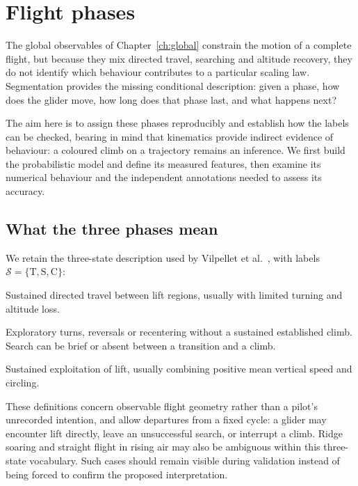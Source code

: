 \chapter{Flight phases}
\label{ch:phases}


The global observables of Chapter~\ref{ch:global} constrain the motion of a complete
flight, but because they mix directed travel, searching and altitude recovery, they do
not identify which behaviour contributes to a particular scaling law. Segmentation
provides the missing conditional description: given a phase, how does the glider move,
how long does that phase last, and what happens next?

The aim here is to assign these phases reproducibly and establish how the labels can
be checked, bearing in mind that kinematics provide indirect evidence of behaviour:
a coloured climb on a trajectory remains an inference. We first build the probabilistic model and define its measured features, then examine its numerical behaviour and the independent
annotations needed to assess its accuracy.

\section{What the three phases mean}
\label{sec:segmentation}
We retain the three-state description used by Vilpellet et al.~\cite{vilpellet2026},
with labels $\mathcal S=\{\mathrm T,\mathrm S,\mathrm C\}$:
\begin{description}[style=nextline]
  \item[Transition (T).] Sustained directed travel between lift regions, usually with
  limited turning and altitude loss.
  \item[Search (S).] Exploratory turns, reversals or recentering without a sustained
  established climb. Search can be brief or absent between a transition and a climb.
  \item[Climb (C).] Sustained exploitation of lift, usually combining positive mean
  vertical speed and circling.
\end{description}
These definitions concern observable flight geometry rather than a pilot's unrecorded
intention, and allow departures from a fixed cycle: a glider may encounter lift directly, leave
an unsuccessful search, or interrupt a climb. Ridge soaring and straight flight in rising
air may also be ambiguous within this three-state vocabulary. Such cases should remain
visible during validation instead of being forced to confirm the proposed interpretation.


